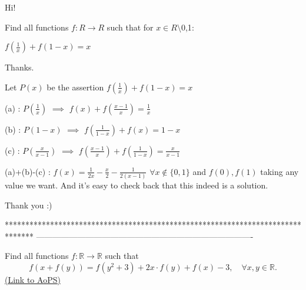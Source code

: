 \begin{solution}
	\begin{tcolorbox}Hi!

Find all functions  $f:R\rightarrow R$ such that for $x \in R 	\setminus${0,1}:

$f(\frac {1}{x} )+ f(1-x) = x $

Thanks.\end{tcolorbox}
Let $P(x)$ be the assertion $f(\frac 1x)+f(1-x)=x$

(a) : $P(\frac 1x)$ $\implies$ $f(x)+f(\frac {x-1}x)=\frac 1x$

(b) : $P(1-x)$ $\implies$ $f(\frac 1{1-x})+f(x)=1-x$

(c) : $P(\frac x{x-1})$ $\implies$ $f(\frac{x-1}x)+f(\frac 1{1-x})=\frac x{x-1}$

(a)+(b)-(c) : $\boxed{f(x)=\frac 1{2x}-\frac x2-\frac 1{2(x-1)}}$ $\forall x\notin\{0,1\}$ and $f(0),f(1)$ taking any value we want.
And it's easy to check back that this indeed is a solution.
\end{solution}



\begin{solution}
	Thank you :)
\end{solution}
*******************************************************************************
-------------------------------------------------------------------------------

\begin{problem}
	Find all functions $f: \mathbb R \to \mathbb R$ such that
\[f(x+f(y))=f(y^2+3)+2x\cdot f(y)+f(x)-3, \quad \forall x,y \in \mathbb R.\]
	\flushright \href{https://artofproblemsolving.com/community/c6h412431}{(Link to AoPS)}
\end{problem}



